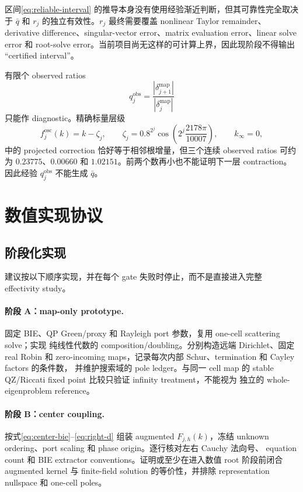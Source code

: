 \documentclass[UTF8,fontset=fandol,11pt,a4paper]{ctexart}
\begin{document}
区间\eqref{eq:reliable-interval} 的推导本身没有使用经验渐近判断，但其可靠性完全取决于
$\bar q$ 和 $r_j$ 的独立有效性。$r_j$ 最终需要覆盖 nonlinear Taylor remainder、
derivative difference、singular-vector error、matrix evaluation error、linear solve
error 和 root-solve error。当前项目尚无这样的可计算上界，因此现阶段不得输出
``certified interval''。

有限个 observed ratios
\[
  q_j^{\mathrm{obs}}
  =\frac{|\delta_{j+1}^{\mathrm{map}}|}
         {|\delta_j^{\mathrm{map}}|}
\]
只能作 diagnostic。精确标量层级
\[
  f_j^{\mathrm{osc}}(k)=k-\zeta_j,
  \qquad
  \zeta_j=0.8^{2^j}\cos\!\left(2^j\frac{2178\pi}{10007}\right),
  \qquad
  k_\infty=0,
\]
中的 projected correction 恰好等于相邻根增量，但三个连续 observed ratios 可约为
$0.23775$、$0.00660$ 和 $1.02151$。前两个数再小也不能证明下一层 contraction。
因此经验 $q_j^{\mathrm{obs}}$ 不能生成 $\bar q$。

\section{数值实现协议}

\subsection{阶段化实现}

建议按以下顺序实现，并在每个 gate 失败时停止，而不是直接进入完整 effectivity study。

\paragraph{阶段 A：map-only prototype.}
固定 BIE、QP Green/proxy 和 Rayleigh port 参数，复用 one-cell scattering solve；实现
纯线性代数的 composition/doubling。分别构造远端 Dirichlet、固定 real Robin 和
zero-incoming maps，记录每次内部 Schur、termination 和 Cayley factors 的条件数，
并维护搜索域的 pole ledger。与同一
cell map 的 stable QZ/Riccati fixed point 比较只验证 infinity treatment，不能视为
独立的 whole-eigenproblem reference。

\paragraph{阶段 B：center coupling.}
按式\eqref{eq:center-bie}--\eqref{eq:right-d} 组装 augmented $F_{j,h}(k)$，冻结
unknown ordering、port scaling 和 phase origin。逐行核对左右 Cauchy 法向号、
equation count 和 BIE extractor conventions。证明或至少在进入数值 root 阶段前闭合
augmented kernel 与 finite-field solution 的等价性，并排除 representation nullspace
和 one-cell poles。
\end{document}
